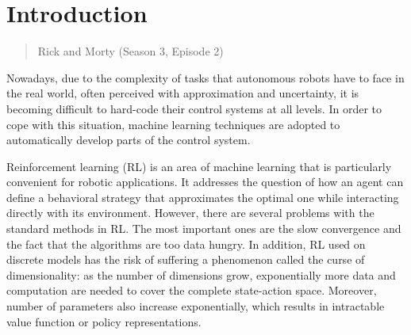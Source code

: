 \chapter{Introduction}
\label{introduction}
\thispagestyle{empty}

\begin{quotation}
{\footnotesize
{}
\begin{flushright}
Rick and Morty (Season 3, Episode 2)
\end{flushright}
}
\end{quotation}


\vspace{0.5cm}

 
Nowadays, due to the complexity of tasks that autonomous robots have to face in the real world, often perceived with approximation and uncertainty, it is becoming difficult to hard-code their control systems at all levels. In order to cope with this situation, machine learning techniques are adopted to automatically develop parts of the control system. 

Reinforcement learning (RL) is an area of machine learning that is particularly convenient for robotic applications. It addresses the question of how an agent can define a behavioral strategy that approximates the optimal one while interacting directly with its environment. However, there are several problems with the standard methods in RL. The most important ones are the slow convergence and the fact that the algorithms are too data hungry. In addition, RL used on discrete models has the risk of suffering a phenomenon called the curse of dimensionality:  as the number of dimensions grow, exponentially more data and computation are needed to cover the complete state-action space. Moreover, number of parameters also increase exponentially, which results in intractable  value function or policy representations. 

